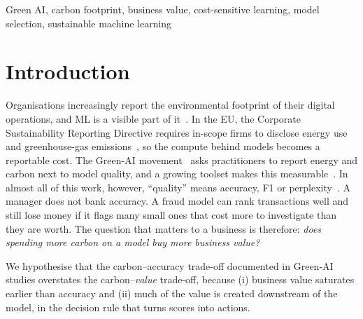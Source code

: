 \documentclass[conference]{IEEEtran}
\begin{document}
\begin{IEEEkeywords}
Green AI, carbon footprint, business value, cost-sensitive learning, model selection, sustainable machine learning
\end{IEEEkeywords}

\section{Introduction}
Organisations increasingly report the environmental footprint of their digital operations, and ML is a visible part of
it~\cite{strubell2019,kaack2022}. In the EU, the Corporate Sustainability Reporting Directive requires in-scope firms to
disclose energy use and greenhouse-gas emissions~\cite{csrd2022}, so the compute behind models becomes a reportable cost.
The Green-AI movement~\cite{schwartz2020} asks practitioners to report energy and carbon next to model quality, and a
growing toolset makes this measurable~\cite{lacoste2019,henderson2020,codecarbon,eco2ai}. In almost all of this work,
however, ``quality'' means accuracy, F1 or perplexity~\cite{verdecchia2023}. A manager does not bank accuracy. A fraud
model can rank transactions well and still lose money if it flags many small ones that cost more to investigate than they
are worth. The question that matters to a business is therefore: \emph{does spending more carbon on a model buy more
business value?}

We hypothesise that the carbon--accuracy trade-off documented in Green-AI studies overstates the
carbon--\emph{value} trade-off, because (i) business value saturates earlier than accuracy and (ii) much of the value
is created downstream of the model, in the decision rule that turns scores into actions.
\end{document}
